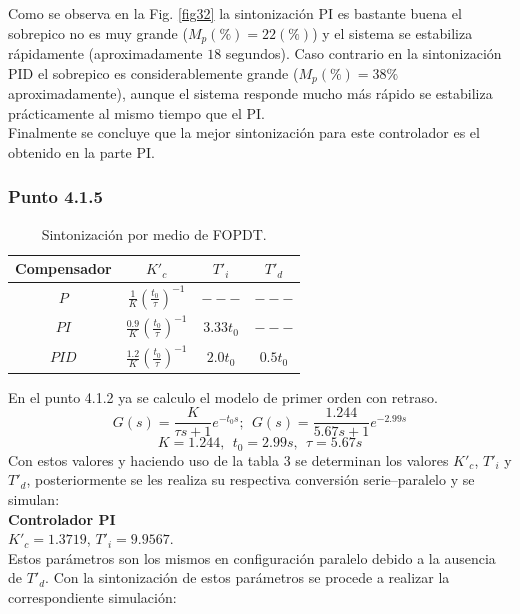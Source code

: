 \documentclass[twocolumn]{IEEEtran}
\begin{document}
\noindent
Como se observa en la Fig. \ref{fig32} la sintonización PI es bastante buena el sobrepico no es muy grande ($M_p(\%)= 22 (\%)$) y el sistema se estabiliza rápidamente (aproximadamente $18$ segundos). Caso contrario en la sintonización PID el sobrepico es considerablemente grande ($M_p (\%)=38\%$ aproximadamente), aunque el sistema responde mucho más rápido se estabiliza prácticamente al mismo tiempo que el PI.\\
Finalmente se concluye que la mejor sintonización para este controlador es el obtenido en la parte PI.

\subsubsection{Punto 4.1.5}
\noindent
\begin{table}[H]
	\centering
\begin{tabular}{|c|c|c|c|}\hline
Compensador & $K'_c$ & $T'_i$ & $T'_d$ \\ \hline
$P$ & $\frac{1}{K}\left( {\frac{{t_0 }}{\tau }} \right)^{ - 1} $ & $---$ & $---$ \\ \hline
$PI$ & $\frac{0.9}{K}\left( {\frac{{t_0 }}{\tau }} \right)^{ - 1} $ & $3.33t_0$ & $---$ \\ \hline
$PID$ & $\frac{1.2}{K}\left( {\frac{{t_0 }}{\tau }} \right)^{ - 1} $ & $2.0t_0$ & $0.5t_0$ \\ \hline
    \end{tabular}
	\caption{Sintonización por medio de FOPDT.}
	\label{tab3}
\end{table}
\noindent
En el punto 4.1.2 ya se calculo el modelo de primer orden con retraso.
\begin{equation}
 G\left( s \right) = \frac{K}{{\tau s + 1}}e^{ - t_0 s};\ \ G\left( s \right) = \frac{{1.244}}{{5.67s + 1}}e^{ - 2.99s} 
\label{ecu000}
\end{equation}
\begin{equation}
 K=1.244,\ \ t_0 = 2.99s,\ \ \tau=5.67s
\label{ecu001}
\end{equation}
\noindent
Con estos valores y haciendo uso de la tabla 3 se determinan los valores $K'_c$, $T'_i$ y $T'_d$, posteriormente se les realiza su respectiva conversión serie–paralelo y se simulan:\\
\textbf{Controlador PI}\\
$K'_c=1.3719$, $T'_i=9.9567$.\\
Estos parámetros son los mismos en configuración paralelo debido a la ausencia de $T'_d$. Con la sintonización de estos parámetros se procede a realizar la correspondiente simulación:
\end{document}
